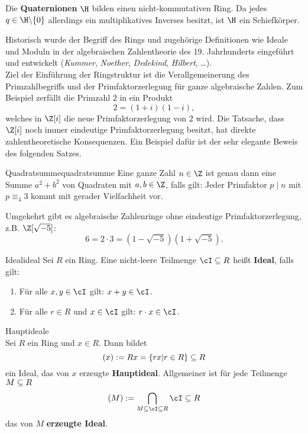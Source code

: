 \begin{beispiel}
Die \textbf{Quaternionen} $\H$ bilden einen nicht-kommutativen Ring. Da jedes $q \in \H \exc \{0\}$ allerdings ein multiplikatives Inverses besitzt, ist $\H$ ein Schiefkörper.
\end{beispiel}
\begin{bemerkung}
Historisch wurde der Begriff des Rings und zugehörige Definitionen wie Ideale und Moduln in der algebraischen Zahlentheorie des 19. Jahrhunderts eingeführt und entwickelt (\textit{Kummer}, \textit{Noether}, \textit{Dedekind}, \textit{Hilbert}, \dots).\\
Ziel der Einführung der Ringstruktur ist die Verallgemeinerung des Primzahlbegriffs und der Primfaktorzerlegung für ganze algebraische Zahlen. Zum Beispiel zerfällt die Primzahl $2$ in ein Produkt
\begin{equation}
2 = (1+i)(1-i),
\end{equation}
welches in $\Z[i]$ die neue Primfaktorzerlegung von $2$ wird. Die Tatsache, dass $\Z[i]$ noch immer eindeutige Primfaktorzerlegung besitzt, hat direkte zahlentheoretische Konsequenzen. Ein Beispiel dafür ist der sehr elegante Beweis des folgenden Satzes.
\end{bemerkung}
\begin{satz}{Quadratsumme}{quadratsumme}
Eine ganze Zahl $n \in \Z$ ist genau dann eine Summe $a^2+b^2$ von Quadraten mit $a,b \in \Z$, falls gilt: Jeder Primfaktor $p \mid n$ mit $ p \equiv_4 3$ kommt mit gerader Vielfachheit vor. 
\end{satz}
Umgekehrt gibt es algebraische Zahlenringe ohne eindeutige Primfaktorzerlegung, z.B. $\Z [\sqrt{-5}]$:
\begin{equation}
6 = 2 \cdot 3 = (1-\sqrt{-5})(1+\sqrt{-5}).
\end{equation}
\begin{definition}{Ideal}{ideal}
Sei $R$ ein Ring. Eine nicht-leere Teilmenge $\cI \sub R$ heißt \textbf{Ideal}, falls gilt:
\begin{enumerate}[({I}1)]
\item Für alle $x, y \in \cI$ gilt: $x+y \in \cI$.
\item Für alle $r \in R$ und $x \in \cI$ gilt: $r \cdot x \in \cI$.
\end{enumerate}
\end{definition}
\begin{beispiel}Hauptideale\\
Sei $R$ ein Ring und $x \in R$. Dann bildet 
\begin{equation}
(x) := Rx = \{rx | r \in R \} \subseteq R
\end{equation}
ein Ideal, das von $x$ erzeugte \textbf{Hauptideal}. Allgemeiner ist für jede Teilmenge $M \subseteq R$ 
\begin{equation}
(M) := \bigcap_{M \sub \cI \sub R} \cI \sub R
\end{equation}
das von $M$ \textbf{erzeugte Ideal}.
\end{beispiel}
